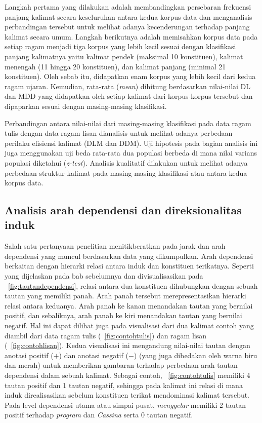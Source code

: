 Langkah pertama yang dilakukan adalah membandingkan persebaran frekuensi panjang kalimat secara keseluruhan antara kedua korpus data dan menganalisis perbandingan tersebut untuk melihat adanya kecenderungan terhadap panjang kalimat secara umum. Langkah berikutnya adalah memisahkan korpus data pada setiap ragam menjadi tiga korpus yang lebih kecil sesuai dengan klasifikasi panjang kalimatnya yaitu kalimat pendek (maksimal 10 konstituen), kalimat menengah (11 hingga 20 konstituen), dan kalimat panjang (minimal 21 konstituen). Oleh sebab itu, didapatkan enam korpus yang lebih kecil dari kedua ragam ujaran. Kemudian, rata-rata (\textit{mean}) dihitung berdasarkan nilai-nilai DL dan MDD yang didapatkan oleh setiap kalimat dari korpus-korpus tersebut dan dipaparkan sesuai dengan masing-masing klasifikasi. 

Perbandingan antara nilai-nilai dari masing-masing klasifikasi pada data ragam tulis dengan data ragam lisan dianalisis untuk melihat adanya perbedaan perilaku efisiensi kalimat (DLM dan DDM). Uji hipotesis pada bagian analisis ini juga menggunakan uji beda rata-rata dua populasi berbeda di mana nilai varians populasi diketahui (\textit{z-test}). Analisis kualitatif dilakukan untuk melihat adanya perbedaan struktur kalimat pada masing-masing klasifikasi atau antara kedua korpus data.

\subsection{Analisis arah dependensi dan direksionalitas induk}
Salah satu pertanyaan penelitian menitikberatkan pada jarak dan arah dependensi yang muncul berdasarkan data yang dikumpulkan. Arah dependensi berkaitan dengan hierarki relasi antara induk dan konstituen terikatnya. Seperti yang dijelaskan pada bab sebelumnya dan divisualisasikan pada \pic~\ref{fig:tautandependensi}, relasi antara dua konstituen dihubungkan dengan sebuah tautan yang memiliki panah. Arah panah tersebut merepresentasikan hierarki relasi antara keduanya. Arah panah ke kanan menandakan tautan yang bernilai positif, dan sebaliknya, arah panah ke kiri menandakan tautan yang bernilai negatif. Hal ini dapat dilihat juga pada visualisasi dari dua kalimat contoh yang diambil dari data ragam tulis (\pic~\ref{fig:contohtulis}) dan ragam lisan (\pic~\ref{fig:contohlisan}). Kedua visualisasi ini mengandung nilai-nilai tautan dengan anotasi positif ($+$) dan anotasi negatif ($-$) (yang juga dibedakan oleh warna biru dan merah) untuk memberikan gambaran terhadap perbedaan arah tautan dependensi dalam sebuah kalimat. Sebagai contoh, \pic~\ref{fig:contohtulis} memiliki 4 tautan positif dan 1 tautan negatif, sehingga pada kalimat ini relasi di mana induk direalisasikan sebelum konstituen terikat mendominasi kalimat tersebut. Pada level dependensi utama atau simpai pusat, \textit{menggelar} memiliki 2 tautan positif terhadap \textit{program} dan \textit{Cassina} serta 0 tautan negatif.

